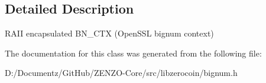 \subsection{Detailed Description}
R\+A\+II encapsulated B\+N\+\_\+\+C\+TX (Open\+S\+SL bignum context) 

The documentation for this class was generated from the following file\+:\begin{DoxyCompactItemize}
\item 
D\+:/\+Documentz/\+Git\+Hub/\+Z\+E\+N\+Z\+O-\/\+Core/src/libzerocoin/bignum.\+h\end{DoxyCompactItemize}
